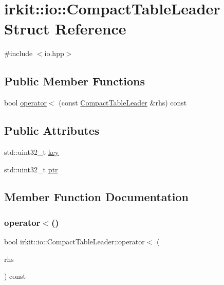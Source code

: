 \hypertarget{structirkit_1_1io_1_1CompactTableLeader}{}\section{irkit\+:\+:io\+:\+:Compact\+Table\+Leader Struct Reference}
\label{structirkit_1_1io_1_1CompactTableLeader}


{\ttfamily \#include $<$io.\+hpp$>$}

\subsection*{Public Member Functions}
\begin{DoxyCompactItemize}
\item 
bool \mbox{\hyperlink{structirkit_1_1io_1_1CompactTableLeader_a82cbeab91134cd41cb640ede22f55e28}{operator$<$}} (const \mbox{\hyperlink{structirkit_1_1io_1_1CompactTableLeader}{Compact\+Table\+Leader}} \&rhs) const
\end{DoxyCompactItemize}
\subsection*{Public Attributes}
\begin{DoxyCompactItemize}
\item 
std\+::uint32\+\_\+t \mbox{\hyperlink{structirkit_1_1io_1_1CompactTableLeader_a173673f554217426147742cbf3365211}{key}}
\item 
std\+::uint32\+\_\+t \mbox{\hyperlink{structirkit_1_1io_1_1CompactTableLeader_af84a980b2256c0fce9151f9df57c93a7}{ptr}}
\end{DoxyCompactItemize}


\subsection{Member Function Documentation}
\mbox{\label{structirkit_1_1io_1_1CompactTableLeader_a82cbeab91134cd41cb640ede22f55e28}} 
\subsubsection{\texorpdfstring{operator$<$()}{operator<()}}
{\footnotesize\ttfamily bool irkit\+::io\+::\+Compact\+Table\+Leader\+::operator$<$ (\begin{DoxyParamCaption}\item[{const \mbox{\hyperlink{structirkit_1_1io_1_1CompactTableLeader}{Compact\+Table\+Leader}} \&}]{rhs }\end{DoxyParamCaption}) const\hspace{0.3cm}{\ttfamily [inline]}}



